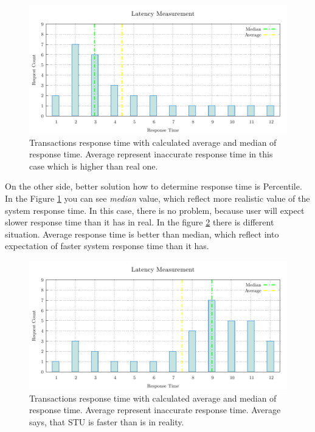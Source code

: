 \begin{figure}[H]
  \centering
  \includegraphics[width=15cm]{obrazky-figures/average_median_1.pdf}
  \caption{Transactions response time with calculated average and median of response time. Average represent  inaccurate response time in this case which is higher than real one.}
  \label{fig:average_percentil_1}
\end{figure}

On the other side, better solution how to determine response time is Percentile. In the Figure \ref{fig:average_percentil_1} you can see \emph{median} value, which reflect more realistic value of the system response time. In this case, there is no problem, because user will expect slower response time than it has in real. In the figure \ref{fig:average_percentil_2} there is different situation. Average response time is better than median, which reflect into expectation of faster system response time than it has.

\begin{figure}[H]
  \centering
  \includegraphics[width=15cm]{obrazky-figures/average_median_2.pdf}
  \caption{Transactions response time with calculated average and median of response time. Average represent  inaccurate response time. Average says, that STU is faster than is in reality.}
  \label{fig:average_percentil_2}
\end{figure}


